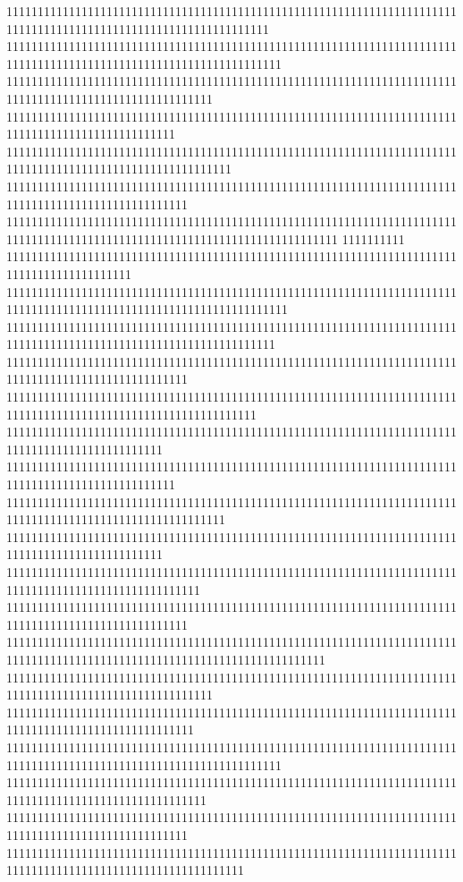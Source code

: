 111111111111111111111111111111111111111111111111111111111111111111111111111111111111111111111111111111111111111111
11111111111111111111111111111111111111111111111111111111111111111111111111111111111111111111111111111111111111111111
111111111111111111111111111111111111111111111111111111111111111111111111111111111111111111111111111111111
111111111111111111111111111111111111111111111111111111111111111111111111111111111111111111111111111
111111111111111111111111111111111111111111111111111111111111111111111111111111111111111111111111111111111111
11111111111111111111111111111111111111111111111111111111111111111111111111111111111111111111111111111
11111111111111111111111111111111111111111111111111111111111111111111111111111111111111111111111111111111111111111111111111111
1111111111
11111111111111111111111111111111111111111111111111111111111111111111111111111111111111111111
111111111111111111111111111111111111111111111111111111111111111111111111111111111111111111111111111111111111111111111
1111111111111111111111111111111111111111111111111111111111111111111111111111111111111111111111111111111111111111111
11111111111111111111111111111111111111111111111111111111111111111111111111111111111111111111111111111
1111111111111111111111111111111111111111111111111111111111111111111111111111111111111111111111111111111111111111
1111111111111111111111111111111111111111111111111111111111111111111111111111111111111111111111111
111111111111111111111111111111111111111111111111111111111111111111111111111111111111111111111111111
11111111111111111111111111111111111111111111111111111111111111111111111111111111111111111111111111111111111
1111111111111111111111111111111111111111111111111111111111111111111111111111111111111111111111111
1111111111111111111111111111111111111111111111111111111111111111111111111111111111111111111111111111111
11111111111111111111111111111111111111111111111111111111111111111111111111111111111111111111111111111
111111111111111111111111111111111111111111111111111111111111111111111111111111111111111111111111111111111111111111111111111
111111111111111111111111111111111111111111111111111111111111111111111111111111111111111111111111111111111
111111111111111111111111111111111111111111111111111111111111111111111111111111111111111111111111111111
11111111111111111111111111111111111111111111111111111111111111111111111111111111111111111111111111111111111111111111
11111111111111111111111111111111111111111111111111111111111111111111111111111111111111111111111111111111
11111111111111111111111111111111111111111111111111111111111111111111111111111111111111111111111111111
11111111111111111111111111111111111111111111111111111111111111111111111111111111111111111111111111111111111111
